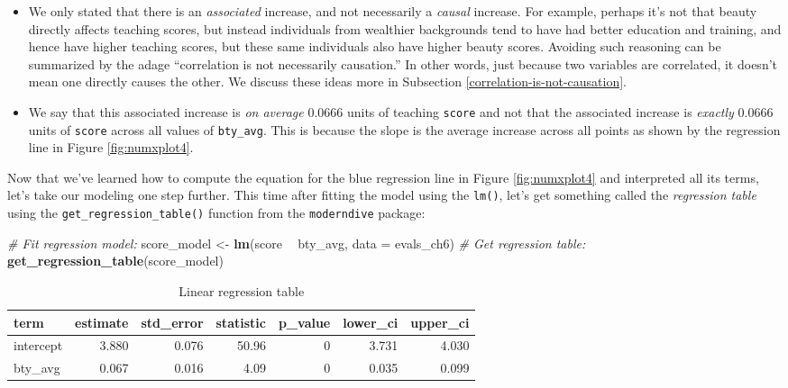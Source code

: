 \documentclass[12pt,]{krantz}
\makeatletter
\newenvironment{Shaded}{\begin{snugshade}}{\end{snugshade}}
\newcommand{\KeywordTok}[1]{\textcolor[rgb]{0.27,0.27,0.27}{\textbf{#1}}}
\newcommand{\DataTypeTok}[1]{\textcolor[rgb]{0.27,0.27,0.27}{#1}}
\newcommand{\StringTok}[1]{\textcolor[rgb]{0.5,0.5,0.5}{#1}}
\newcommand{\CommentTok}[1]{\textcolor[rgb]{0.37,0.37,0.37}{\textit{#1}}}
\newcommand{\OperatorTok}[1]{\textcolor[rgb]{0.43,0.43,0.43}{\textbf{#1}}}
\newcommand{\NormalTok}[1]{#1}
\providecommand{\tightlist}{%
  \setlength{\itemsep}{0pt}\setlength{\parskip}{0pt}}
\newenvironment{kframe}{%
\medskip{}
\setlength{\fboxsep}{.8em}
 \def\at@end@of@kframe{}%
 \ifinner\ifhmode%
  \def\at@end@of@kframe{\end{minipage}}%
  \begin{minipage}{\columnwidth}%
 \fi\fi%
 \def\FrameCommand##1{\hskip\@totalleftmargin \hskip-\fboxsep
 \colorbox{shadecolor}{##1}\hskip-\fboxsep
     \hskip-\linewidth \hskip-\@totalleftmargin \hskip\columnwidth}%
 \MakeFramed {\advance\hsize-\width
   \@totalleftmargin\z@ \linewidth\hsize
   \@setminipage}}%
 {\par\unskip\endMakeFramed%
 \at@end@of@kframe}
\renewenvironment{Shaded}{\begin{kframe}}{\end{kframe}}
\theoremstyle{definition}
\theoremstyle{definition}
\theoremstyle{definition}
\theoremstyle{remark}
\makeatother
\begin{document}
\begin{itemize}
\tightlist
\item
  We only stated that there is an \emph{associated} increase, and not
  necessarily a \emph{causal} increase. For example, perhaps it's not
  that beauty directly affects teaching scores, but instead individuals
  from wealthier backgrounds tend to have had better education and
  training, and hence have higher teaching scores, but these same
  individuals also have higher beauty scores. Avoiding such reasoning
  can be summarized by the adage ``correlation is not necessarily
  causation.'' In other words, just because two variables are
  correlated, it doesn't mean one directly causes the other. We discuss
  these ideas more in Subsection \ref{correlation-is-not-causation}.\\
\item
  We say that this associated increase is \emph{on average} 0.0666 units
  of teaching \texttt{score} and not that the associated increase is
  \emph{exactly} 0.0666 units of \texttt{score} across all values of
  \texttt{bty\_avg}. This is because the slope is the average increase
  across all points as shown by the regression line in Figure
  \ref{fig:numxplot4}.
\end{itemize}

Now that we've learned how to compute the equation for the blue
regression line in Figure \ref{fig:numxplot4} and interpreted all its
terms, let's take our modeling one step further. This time after fitting
the model using the \texttt{lm()}, let's get something called the
\emph{regression table} using the \texttt{get\_regression\_table()}
function from the \texttt{moderndive} package:

\begin{Shaded}
\begin{Highlighting}[]
\CommentTok{# Fit regression model:}
\NormalTok{score_model <-}\StringTok{ }\KeywordTok{lm}\NormalTok{(score }\OperatorTok{~}\StringTok{ }\NormalTok{bty_avg, }\DataTypeTok{data =}\NormalTok{ evals_ch6)}
\CommentTok{# Get regression table:}
\KeywordTok{get_regression_table}\NormalTok{(score_model)}
\end{Highlighting}
\end{Shaded}

\begin{table}[H]

\caption{\label{tab:numxplot4b}Linear regression table}
\centering
\fontsize{10}{12}\selectfont
\begin{tabular}[t]{lrrrrrr}
\toprule
term & estimate & std\_error & statistic & p\_value & lower\_ci & upper\_ci\\
\midrule
intercept & 3.880 & 0.076 & 50.96 & 0 & 3.731 & 4.030\\
bty\_avg & 0.067 & 0.016 & 4.09 & 0 & 0.035 & 0.099\\
\bottomrule
\end{tabular}
\end{table}
\end{document}
